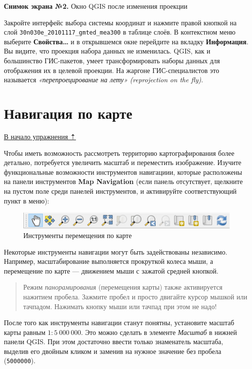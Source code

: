 \documentclass[
  12pt,
]{book}
\begin{document}
\textbf{Снимок экрана №2.} Окно QGIS после изменения проекции

Закройте интерфейс выбора системы координат и нажмите правой кнопкой на слой \texttt{30n030e\_20101117\_gmted\_mea300} в таблице слоёв. В контекстном меню выберите \textbf{Свойства\ldots{}} и в открывшемся окне перейдите на вкладку \textbf{Информация}. Вы видите, что проекция набора данных не изменилась. QGIS, как и большинство ГИС-пакетов, умеет трансформировать наборы данных для отображения их в целевой проекции. На жаргоне ГИС-специалистов это называется \emph{«перепроецирование на лету» (reprojection on the fly)}.

\hypertarget{map-design-general-navigation}{%
\section{Навигация по карте}\label{map-design-general-navigation}}

\protect\hyperlink{map-design-general}{В начало упражнения ⇡}

Чтобы иметь возможность рассмотреть территорию картографирования более детально, потребуется увеличить масштаб и переместить изображение. Изучите функциональные возможности инструментов навигациии, которые расположены на панели инструментов \textbf{Map Navigation} (если панель отсутствует, щелкните на пустом поле среди панелей инструментов, и активируйте соответствующий пункт в меню):

\begin{figure}
\centering
\includegraphics{images/Ex01_MapGeneral/NavigationPanel.png}
\caption{Инструменты перемещения по карте}
\end{figure}

Некоторые инструменты навигации могут быть задействованы независимо. Например, масштабирование выполняется прокруткой колеса мыши, а перемещение по карте --- движением мыши с зажатой средней кнопкой.

\begin{quote}
Режим \emph{панорамирования} (перемещения карты) также активируется нажитием пробела. Зажмите пробел и просто двигайте курсор мышкой или тачпадом. Нажимать кнопку мыши или тачпад при этом не надо!
\end{quote}

После того как инструменты навигации станут понятны, установите масштаб карты равным \(1:5~000~000\). Это можно сделать в элементе \emph{Масштаб} в нижней панели QGIS. При этом достаточно ввести только знаменатель масштаба, выделив его двойным кликом и заменив на нужное значение без пробела (\texttt{5000000}).
\end{document}
